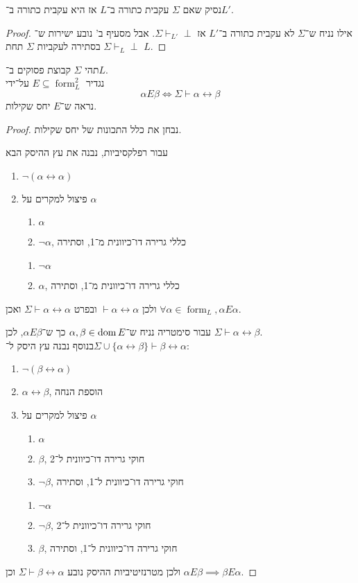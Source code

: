 \subquestion{}
נסיק שאם $\Sigma$ עקבית כתורה ב־$L$ אז היא עקבית כתורה ב־$L'$.
\begin{proof}
	אילו נניח ש־$\Sigma$ לא עקבית כתורה ב־$L'$ אז $\Sigma \vdash_{L'} \perp$.
	אבל מסעיף ב' נובע ישירות ש־$\Sigma \vdash_L \perp$ בסתירה לעקביות $\Sigma$ תחת $L$.
\end{proof}

\question{}
תהי $\Sigma$ קבוצת פסוקים ב־$L$. \\
נגדיר $E \subseteq \operatorname{form}_L^2$ על־ידי
\[
	\alpha E \beta \iff \Sigma \vdash \alpha \leftrightarrow \beta
\]
נראה ש־$E$ יחס שקילות.
\begin{proof}
	נבחן את כלל התכונות של יחס שקילות.

	עבור רפלקסיביות, נבנה את עץ ההיסק הבא
	\begin{enumerate}
		\item $\lnot (\alpha \leftrightarrow \alpha)$
		\item פיצול למקרים על $\alpha$
			\begin{enumerate}
				\item $\alpha$
				\item $\lnot \alpha$, כללי גרירה דו־כיוונית מ־1, וסתירה
			\end{enumerate}
			\begin{enumerate}
				\item $\lnot \alpha$
				\item $\alpha$, כללי גרירה דו־כיוונית מ־1, וסתירה
			\end{enumerate}
	\end{enumerate}
	ולכן $\vdash \alpha \leftrightarrow \alpha$ ובפרט $\Sigma \vdash \alpha \leftrightarrow \alpha$ ואכן $\forall \alpha \in \operatorname{form}_L, \alpha E \alpha$.

	עבור סימטריה נניח ש־$\alpha, \beta \in \operatorname{dom} E$ כך ש־$\alpha E \beta$, לכן $\Sigma \vdash \alpha \leftrightarrow \beta$. \\
	בנוסף נבנה עץ היסק ל־$\Sigma \cup \{ \alpha \leftrightarrow \beta \} \vdash \beta \leftrightarrow \alpha$:
	\begin{enumerate}
		\item $\lnot (\beta \leftrightarrow \alpha)$
		\item $\alpha \leftrightarrow \beta$, הוספת הנחה
		\item פיצול למקרים על $\alpha$
			\begin{enumerate}
				\item $\alpha$
				\item $\beta$, חוקי גרירה דו־כיוונית ל־2
				\item $\lnot \beta$, חוקי גרירה דו־כיוונית ל־1, וסתירה
			\end{enumerate}
			\begin{enumerate}
				\item $\lnot \alpha$
				\item $\lnot \beta$, חוקי גרירה דו־כיוונית ל־2
				\item $\beta$, חוקי גרירה דו־כיוונית ל־1, וסתירה
			\end{enumerate}
	\end{enumerate}
	ולכן מטרנזיטיביות ההיסק נובע $\Sigma \vdash \beta \leftrightarrow \alpha$ וכן $\alpha E \beta \implies \beta E \alpha$.


\end{proof}
